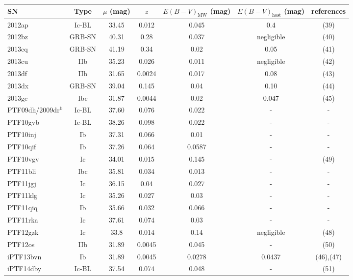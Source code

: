 \documentclass[a4paper,fleqn,usenatbib]{mnras}
\begin{document}
\begin{table}
 \centering
 \begin{minipage}{125mm}
  \begin{tabular}{lcccccc}
  \hline
 SN & Type & $\mu$ (mag) & $z$ & $E(B-V)_{\mathrm{MW}}$ (mag) & $E(B-V)_{\mathrm{host}}$ (mag) & references \\
  \hline
2012ap&Ic-BL&33.45&0.012&0.045&0.4&(39)\\
2012bz&GRB-SN&40.31&0.28&0.037&negligible&(40)\\
2013cq&GRB-SN&41.19&0.34&0.02&0.05&(41)\\
2013cu&IIb&35.23&0.026&0.011&negligible&(42)\\
2013df&IIb&31.65&0.0024&0.017&0.08&(43)\\
2013dx&GRB-SN&39.04&0.145&0.04&0.10&(44)\\
2013ge&Ibc&31.87&0.0044&0.02&0.047&(45)\\
PTF09dh/2009dr$^{\mathrm{b}}$&Ic-BL&37.60&0.076&0.022&-&-\\
PTF10gvb&Ic-BL&38.26&0.098&0.022&-&-\\
PTF10inj&Ib&37.31&0.066&0.01&-&-\\
PTF10qif&Ib&37.26&0.064&0.0587&-&-\\
PTF10vgv&Ic&34.01&0.015&0.145&-&(49)\\
PTF11bli&Ibc&35.81&0.034&0.013&-&-\\
PTF11jgj&Ic&36.15&0.04&0.027&-&-\\
PTF11klg&Ic&35.26&0.027&0.03&-&-\\
PTF11qiq&Ib&35.66&0.032&0.066&-&-\\
PTF11rka&Ic&37.61&0.074&0.03&-&-\\
PTF12gzk&Ic&33.8&0.014&0.14&negligible&(48)\\
PTF12os&IIb&31.89&0.0045&0.045&-& (50)\\
iPTF13bvn&Ib&31.89&0.0045&0.0278&0.0437&(46),(47)\\
iPTF14dby&Ic-BL&37.54&0.074&0.048&-&(51)\\
  \hline

\end{tabular}
\end{minipage}
\end{table}
\end{document}
